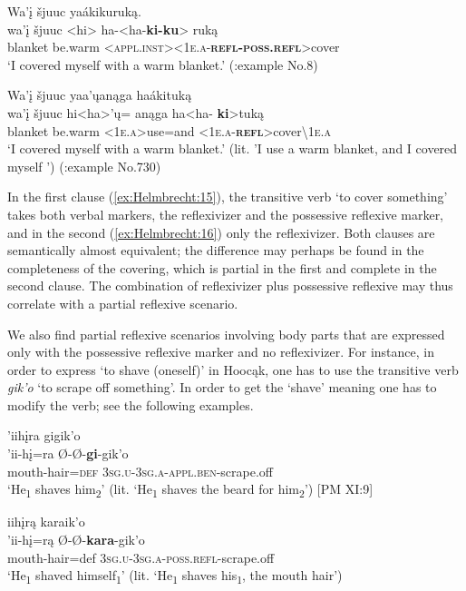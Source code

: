 \documentclass[output=paper]{langscibook}
\begin{document}
\ea \label{ex:Helmbrecht:15} 
\glll  Wa'į šjuuc yaákikuruką.\\
  {wa'į} {šjuuc}   {<hi>   ha-<ha-\textbf{ki-}\textbf{ku}>  ruką}\\
  {blanket} {be.warm} {<\textsc{appl.inst><1e.a-\textbf{\textsc{refl}-poss.refl}}>cover}\\
  \glt `I covered myself with a warm blanket.' (\citealt{Hartmann2013}:example No.8)
\z 

\ea  \label{ex:Helmbrecht:16} 
   \glll Wa'į šjuuc {yaa'ųanąga haákituką} \\
  {wa'į} {šjuuc} {hi<ha>'ų= anąga ha<ha- \textbf{ki}>tuką}\\
  {blanket} {be.warm} {<\textsc{1e.a}>use=and  <\textsc{1e.a}-\textbf{\textsc{\textsc{refl}}}>cover{\textbackslash}\textsc{1e.a}}\\
 \glt `I covered myself with a warm blanket.' (lit. 'I use a warm blanket, and I covered myself ')  (\citealt{Hartmann2013}:example No.730)
\z 

In the first clause (\ref{ex:Helmbrecht:15}), the transitive verb `to cover something' takes both verbal markers, the reflexivizer and the possessive reflexive marker, and in the second (\ref{ex:Helmbrecht:16}) only the reflexivizer. Both clauses are semantically almost equivalent; the difference may perhaps be found in the completeness of the covering, which is partial in the first and complete in the second clause. The combination of reflexivizer plus possessive reflexive may thus correlate with a partial reflexive scenario. 

We also find partial reflexive scenarios involving body parts that are expressed only with the possessive reflexive marker and no reflexivizer. For instance, in order to express `to shave (oneself)' in Hoocąk, one has to use the transitive verb \textit{gik'o} `to scrape off something'. In order to get the `shave' meaning one has to modify the verb; see the following examples. 

\ea  \label{ex:Helmbrecht:17}
 \glll 'iihįra gigik'o\\
  {'ii-hį=ra} {Ø-Ø-\textbf{gi}{}-gik'o}\\
  {mouth-hair=\textsc{def}} {\textsc{3sg.u-3sg.a-appl.ben}-scrape.off}\\
 \glt `He\textsubscript{1} shaves him\textsubscript{2}' (lit. `He\textsubscript{1} shaves the beard for him\textsubscript{2}') [PM XI:9]
\z 


\ea \label{ex:Helmbrecht:18} 
  \glll iihįrą karaik'o \\
  'ii-hį=rą  Ø-Ø-\textbf{kara}-gik'o\\ 
  mouth-hair=def 3\textsc{sg.u-3sg.a-poss}.\textsc{refl}-scrape.off\\
  \glt `He\textsubscript{1} shaved himself\textsubscript{1}' (lit. `He\textsubscript{1} shaves his\textsubscript{1}, the mouth hair')
\z 
\end{document}

